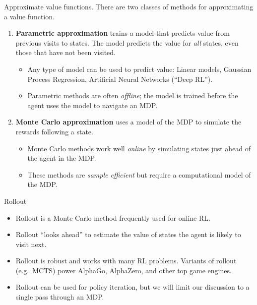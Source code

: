 \documentclass[9pt]{beamer}
\newcommand\lspace{\addtolength{\itemsep}{0.5\baselineskip}}
\begin{document}
\begin{frame}{Approximate value functions.}
There are two classes of methods for approximating a value function.
\bigskip

\begin{enumerate}\lspace
	\item \textbf{Parametric approximation} trains a model that predicts value from previous visits to states. The model predicts the value for \emph{all} states, even those that have not been visited.
	\begin{itemize}
		\item Any type of model can be used to predict value: Linear models, Gaussian Process Regression, Artificial Neural Networks (``Deep RL'').
		\item Parametric methods are often \emph{offline}; the model is trained before the agent uses the model to navigate an MDP.
	\end{itemize}
	\pause
	\item \textbf{Monte Carlo approximation} uses a model of the MDP to simulate the rewards following a state.
	\begin{itemize}
		\item Monte Carlo methods work well \emph{online} by simulating states just ahead of the agent in the MDP.
		\item These methods are \emph{sample efficient} but require a computational model of the MDP.
	\end{itemize}
\end{enumerate}
	
\end{frame}

\begin{frame}{Rollout}

\begin{itemize}\lspace
	\item Rollout is a Monte Carlo method frequently used for online RL.
	\item Rollout ``looks ahead'' to estimate the value of states the agent is likely to visit next.
	\item Rollout is robust and works with many RL problems. Variants of rollout (e.g.\ MCTS) power AlphaGo, AlphaZero, and other top game engines.
	\item Rollout can be used for policy iteration, but we will limit our discussion to a single pass through an MDP.
\end{itemize}
	
\end{frame}
\end{document}
